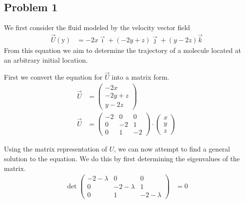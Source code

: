 \documentclass[10pt]{article}
\begin{document}
\begin{multicols}{2}

  \section{Problem 1}\label{sec:problem_1_}

  We first consider the fluid modeled by the velocity vector field
  \begin{align*}
    \vec{U}\left(\mathrm{y}\right) &=  -2x \vec{\imath}+\left(-2y+z\right)\vec{\jmath}+\left(y-2z\right)\vec{k}
  \end{align*}
  From this equation we aim to determine the trajectory of a molecule located at
  an arbitrary initial location.

  First we convert the equation for $\vec{U}$ into a matrix form.
  \begin{align*}
    \vec{U} &= \begin{pmatrix}
      -2x \\ -2y+z \\ y-2z
    \end{pmatrix}\\
    \vec{U} &= \begin{pmatrix}
      -2 & 0 & 0 \\
      0 & -2 & 1 \\
      0 & 1 & -2
      \end{pmatrix} \cdot \begin{pmatrix}
      x \\ y \\ z
    \end{pmatrix}
  \end{align*}

  Using the matrix representation of $U$, we can now attempt to find a general solution to the
  equation. We do this by first determining the eigenvalues of the matrix.
  \begin{align*}
    \det\begin{pmatrix}
      -2-\lambda & 0 & 0\\
      0 & -2-\lambda & 1\\
      0 & 1 & -2-\lambda
    \end{pmatrix} &= 0
  \end{align*}


\end{multicols}
\end{document}
